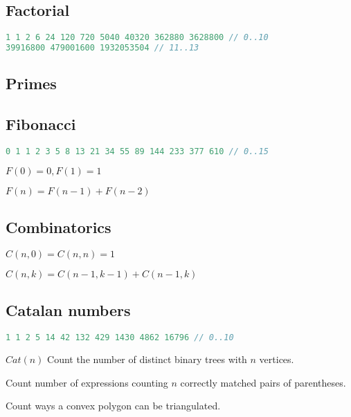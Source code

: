 \documentclass[a4paper,landscape,8pt]{article}
\begin{document}
\begin{multicols}{2}
\subsection{Factorial}

\begin{lstlisting}[language=C++]
1 1 2 6 24 120 720 5040 40320 362880 3628800 // 0..10
39916800 479001600 1932053504 // 11..13
\end{lstlisting}

\subsection{Primes}



\subsection{Fibonacci}

\begin{lstlisting}[language=C++]
0 1 1 2 3 5 8 13 21 34 55 89 144 233 377 610 // 0..15
\end{lstlisting}

$F(0) = 0, F(1) = 1$

$F(n) = F(n - 1) + F(n - 2)$

\subsection{Combinatorics}

$C(n,0) = C(n,n) = 1$

$C(n,k) = C(n - 1, k - 1) + C(n - 1, k)$

\subsection{Catalan numbers}

\begin{lstlisting}[language=C++]
1 1 2 5 14 42 132 429 1430 4862 16796 // 0..10
\end{lstlisting}

\begin{enumerate*}
    \item $Cat(n)$ Count the number of distinct binary trees with $n$ vertices.
    \item Count number of expressions counting $n$ correctly matched pairs of parentheses.
    \item Count ways a convex polygon can be triangulated.
\end{enumerate*}


\end{multicols}
\end{document}

